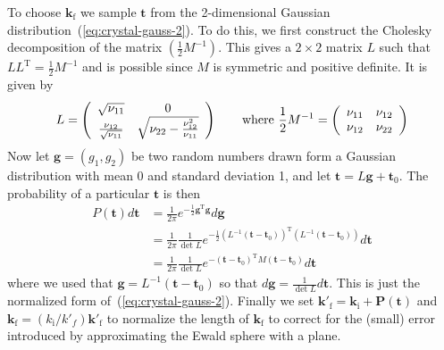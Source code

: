 To choose $\boldsymbol{k}_\textrm{f}$ we sample $\boldsymbol{t}$ from the
2-dimensional Gaussian distribution~(\ref{eq:crystal-gauss-2}). To do
this, we first construct the Cholesky decomposition of the matrix
$(\frac{1}{2}M^{-1})$. This gives a $2\times 2$ matrix $L$ such that $L
L^\textrm{T} = \frac{1}{2}M^{-1}$ and is possible since $M$ is symmetric
and positive definite. It is given by
$$
  L = \left(
  \begin{array}[c]{cc}
    \sqrt{\nu_{11}} & 0 \\
    \frac{\nu_{12}}{\sqrt{\nu_{11}}} & \sqrt{\nu_{22} - \frac{\nu_{12}^2}{\nu_{11}}}
  \end{array}\right)
\qquad\hbox{where }
  \frac{1}{2}M^{-1} = \left(
  \begin{array}[c]{cc}
    \nu_{11} & \nu_{12} \\
    \nu_{12} & \nu_{22}
  \end{array}\right)
$$
Now let $\boldsymbol{g} = (g_1, g_2)$ be two random numbers drawn form a
Gaussian distribution with mean 0 and standard deviation 1, and let
$\boldsymbol{t} = L\boldsymbol{g} + \boldsymbol{t}_0$. The probability
of a particular $\boldsymbol{t}$ is then
\begin{equation}
  \label{eq:crystal-gauss-prob-1}
  \begin{aligned}
  P(\boldsymbol{t})d\boldsymbol{t}
    &=  \frac{1}{2\pi}
      e^{-\frac{1}{2}\boldsymbol{g}^\textrm{T}\boldsymbol{g}} d\boldsymbol{g}  \\
    &=  \frac{1}{2\pi}\frac{1}{\det L}
      e^{-\frac{1}{2}(L^{-1}(\boldsymbol{t}-\boldsymbol{t}_0))^\textrm{T}
          (L^{-1}(\boldsymbol{t}-\boldsymbol{t}_0))} d\boldsymbol{t}  \\
    &=  \frac{1}{2\pi}\frac{1}{\det L}
      e^{-(\boldsymbol{t}-\boldsymbol{t}_0)^\textrm{T}
          M(\boldsymbol{t}-\boldsymbol{t}_0)} d\boldsymbol{t}
  \end{aligned}
\end{equation}
where we used that
$\boldsymbol{g}=L^{-1}(\boldsymbol{t}-\boldsymbol{t}_0)$ so that
$d\boldsymbol{g} = \frac{1}{\det L}d\boldsymbol{t}$. This is just the
normalized form of~(\ref{eq:crystal-gauss-2}). Finally we set
$\boldsymbol{k}'_\textrm{f} = \boldsymbol{k}_\textrm{i} +
\boldsymbol{P}(\boldsymbol{t})$ and
$\boldsymbol{k}_\textrm{f} = (k_\textrm{i}/k'_f)\boldsymbol{k}'_\textrm{f}$ to
normalize the length of $\boldsymbol{k}_\textrm{f}$ to correct for the
(small) error introduced by approximating the Ewald sphere with a plane.

